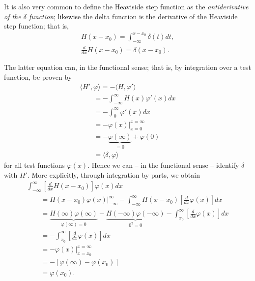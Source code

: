 It is also very common to define the  Heaviside step function as the
{\em antiderivative  of the $\delta$ function};
likewise the delta function is the derivative of the Heaviside step function; that is,
\begin{equation}
\begin{split}
H(x-x_0)
=
\int_{-\infty}^{x-x_0} \delta (t) dt,\\
\frac{d}{dx} H(x-x_0)=\delta (x-x_0).
\end{split}
\end{equation}

{\color{OliveGreen}
\bproof
The latter equation can, in the functional sense; that is, by integration over a test function,
be proven by
\begin{equation}
\begin{split}
\langle   H' , \varphi   \rangle = - \langle  H ,  \varphi'   \rangle      \\
\qquad =
-\int_{-\infty}^\infty H(x) \varphi' (x)  dx \\
\qquad =
-\int_{0}^\infty  \varphi' (x)  dx \\
\qquad =
-\left.   \varphi  (x) \right|_{x=0}^{x= \infty}   \\
\qquad =
 -   \underbrace{\varphi  (\infty)}_{=0} +  \varphi  (0)
\\
\qquad =    \langle   \delta , \varphi  \rangle
\end{split}
\end{equation}
for all test functions $\varphi (x)$. Hence we can -- in the functional sense  -- identify $\delta$ with $H'$.
More explicitly, through integration by parts, we obtain
\begin{equation}
\begin{split}
\int _{-\infty}^\infty \left[\frac{d}{dx} H(x-x_0)\right] \varphi (x) dx       \\
\qquad =
\left. H(x-x_0) \varphi (x)\right| _{-\infty}^\infty - \int _{-\infty}^\infty H(x-x_0) \left[\frac{d}{dx} \varphi (x)\right] dx \\
\qquad =
\underbrace{H(\infty)\varphi(\infty)}_{\varphi(\infty)=0} - \underbrace{H(-\infty)\varphi(-\infty)}_{0^2=0}
   - \int _{x_0}^\infty \left[\frac{d}{dx} \varphi (x)\right] dx  \\
\qquad =  - \int _{x_0}^\infty \left[\frac{d}{dx} \varphi (x)\right] dx \\
\qquad =    -  \left.  \varphi (x)   \right| _{x=x_0}^{x= \infty} \\
\qquad =    - [  \varphi (\infty)  - \varphi (x_0)] \\
\qquad =     \varphi (x_0).
\end{split}
\end{equation}


\eproof
}

